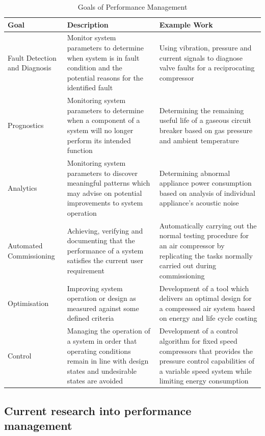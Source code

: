 \begin{table}
  \centering
  \caption{Goals of Performance Management}
    \begin{tabular}{p{.3\linewidth}p{.3\linewidth}p{.3\linewidth}}
    \toprule
    Goal  & Description & Example Work \\
    \midrule
    Fault Detection and Diagnosis & Monitor system parameters to determine when system is in fault condition and the potential reasons for the identified fault & Using vibration, pressure and current signals to diagnose valve faults for a reciprocating compressor \cite{Tran2014} \\
    Prognostics & Monitoring system parameters to determine when a component of a system will no longer perform its intended function \cite{Vachtsevanos2006} & Determining the remaining useful life of a gaseous circuit breaker  based on gas pressure and ambient temperature \cite{Catterson2013} \\
    Analytics & Monitoring system parameters to discover meaningful patterns which may advise on potential improvements to system operation & Determining abnormal appliance power consumption based on analysis of individual appliance’s acoustic noise \cite{Pathak2015} \\
    Automated Commissioning & Achieving, verifying and documenting that the performance of a system satisfies the current user requirement & Automatically carrying out the normal testing procedure for an air compressor by replicating the tasks normally carried out during commissioning \cite{Mazid2008} \\
    Optimisation & Improving system operation or design as measured against some defined criteria & Development of a tool which delivers an optimal design for a compressed air system based on energy and life cycle costing \cite{Friden2012} \\
    Control & Managing the operation of a system in order that operating conditions remain in line with design states and undesirable states are avoided & Development of a control algorithm for fixed speed compressors that provides the pressure control capabilities of a variable speed system while limiting energy consumption \cite{Facchinetti} \\
    \bottomrule
    \end{tabular}%
  \label{tab:goalsmgmt}%
\end{table}%

\subsection{Current research into performance management}

